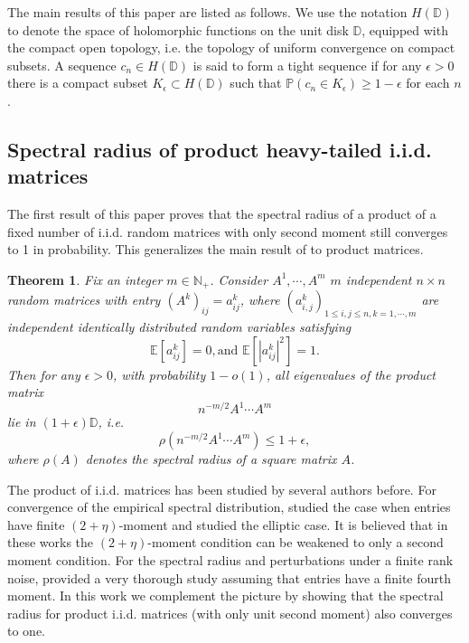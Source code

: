 \documentclass[12pt, reqno]{amsart}
\newtheorem{theorem}{Theorem}[section]
\theoremstyle{definition}
\theoremstyle{remark}
\numberwithin{equation}{section}
\begin{document}
The main results of this paper are listed as follows. We use the notation $H(\mathbb{D})$ to denote the space of holomorphic functions on the unit disk $\mathbb{D}$, equipped with the compact open topology, i.e. the topology of uniform convergence on compact subsets. A sequence $c_n\in H(\mathbb{D})$ is said to form a tight sequence if for any $\epsilon>0$ there is a compact subset $K_\epsilon\subset H(\mathbb{D})$ such that $\mathbb{P}(c_n\in K_\epsilon)\geq 1-\epsilon$ for each $n$.

\subsection{Spectral radius of product heavy-tailed i.i.d. matrices}

The first result of this paper proves that the spectral radius of a product of a fixed number of i.i.d. random matrices with only second moment still converges to 1 in probability. This generalizes the main result of \cite{bordenave2021convergence} to product matrices.

\begin{theorem}\label{spectralradiusproduct}
 Fix an integer $m\in\mathbb{N}_+$. Consider $A^1,\cdots,A^m$ $m$ independent $n\times n$ random matrices with entry $(A^k)_{ij}=a^k_{ij}$, where $(a^k_{i,j})_{1\leq i,j\leq n,k=1,\cdots,m}$ are independent identically distributed random variables satisfying 
    \begin{equation}
        \mathbb{E}[a_{ij}^k]=0,\text{and } 
  \mathbb{E}[|a_{ij}^k|^2]=1.   \end{equation}
  Then for any $\epsilon>0$, with probability $1-o(1)$, all eigenvalues of the product matrix $$n^{-m/2}A^1\cdots A^m$$ lie in $(1+\epsilon)\mathbb{D}$, i.e. 
  $$
\rho(n^{-m/2}A^1\cdots A^m)\leq 1+\epsilon,
  $$ where $\rho(A)$ denotes the spectral radius of a square matrix $A$.
\end{theorem}

The product of i.i.d. matrices has been studied by several authors before. For convergence of the empirical spectral distribution, \cite{MR2861673} studied the case when entries have finite $(2+\eta)$-moment and \cite{o2015products} studied the elliptic case. It is believed that in these works the $(2+\eta)$-moment condition can be weakened to only a second moment condition. For the spectral radius and perturbations under a finite rank noise, \cite{MR4076784} provided a very thorough study assuming that entries have a finite fourth moment. In this work we complement the picture by showing that the spectral radius for product i.i.d. matrices (with only unit second moment) also converges to one. 
\end{document}
